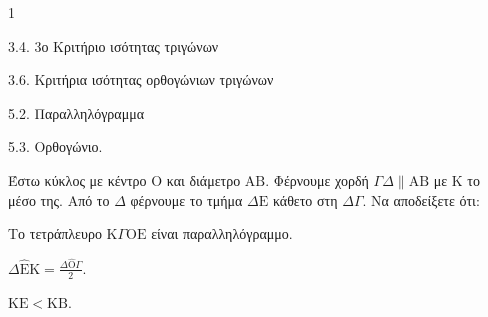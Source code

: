\begin{ylh}{1}
    \item 3.4. 3ο Κριτήριο ισότητας τριγώνων
    \item 3.6. Κριτήρια ισότητας ορθογώνιων τριγώνων
    \item 5.2. Παραλληλόγραμμα
    \item 5.3. Ορθογώνιο.
\end{ylh}
Έστω κύκλος με κέντρο $\mathrm{O}$ και διάμετρο $\mathrm{A}\mathrm{B}$. Φέρνουμε χορδή $\Gamma\Delta \parallel \mathrm{A}\mathrm{B}$ με $\mathrm{K}$ το μέσο της. Από το $\Delta$ φέρνουμε το τμήμα $\Delta\mathrm{E}$ κάθετο στη $\Delta\Gamma$.
Να αποδείξετε ότι:
\begin{alist}
    \item Το τετράπλευρο $\mathrm{K}\Gamma\mathrm{O}\mathrm{E}$ είναι παραλληλόγραμμο. 
    \item $\Delta\hat{\mathrm{E}}\mathrm{K} = \frac{\Delta\hat{\mathrm{O}}\Gamma}{2}$. 
    \item $\mathrm{K}\mathrm{E} < \mathrm{K}\mathrm{B}$. 
\end{alist}
